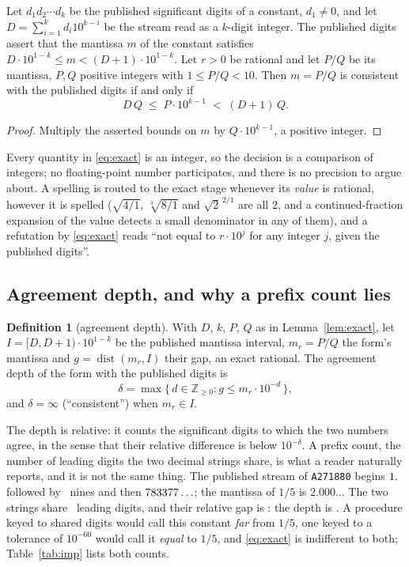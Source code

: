 \documentclass[11pt]{article}
\theoremstyle{definition}
\newtheorem{definition}{Definition}
\theoremstyle{plain}
\begin{document}
\begin{lemma}\label{lem:exact}
Let $d_1d_2\cdots d_k$ be the published significant digits of a constant, $d_1\neq0$, and let $D=\sum_{i=1}^k d_i10^{k-i}$ be the stream read as a $k$-digit integer. The published digits assert that the mantissa $m$ of the constant satisfies $D\cdot10^{1-k}\le m<(D+1)\cdot10^{1-k}$. Let $r>0$ be rational and let $P/Q$ be its mantissa, $P,Q$ positive integers with $1\le P/Q<10$. Then $m=P/Q$ is consistent with the published digits if and only if
\begin{equation}\label{eq:exact}
D\,Q\;\le\;P\cdot10^{k-1}\;<\;(D+1)\,Q .
\end{equation}
\end{lemma}
\begin{proof}
Multiply the asserted bounds on $m$ by $Q\cdot10^{k-1}$, a positive integer.
\end{proof}

Every quantity in \eqref{eq:exact} is an integer, so the decision is a comparison of integers; no floating-point number participates, and there is no precision to argue about. A spelling is routed to the exact stage whenever its \emph{value} is rational, however it is spelled ($\sqrt{4/1}$, $\sqrt[3]{8/1}$ and $\sqrt2^{\,2/1}$ are all $2$, and a continued-fraction expansion of the value detects a small denominator in any of them), and a refutation by \eqref{eq:exact} reads ``not equal to $r\cdot10^j$ for any integer $j$, given the published digits''.

\subsection{Agreement depth, and why a prefix count lies}\label{sec:depth}

\begin{definition}[agreement depth]\label{def:depth}
With $D$, $k$, $P$, $Q$ as in Lemma~\ref{lem:exact}, let $I=[D,D+1)\cdot10^{1-k}$ be the published mantissa interval, $m_r=P/Q$ the form's mantissa and $g=\operatorname{dist}(m_r,I)$ their gap, an exact rational. The agreement depth of the form with the published digits is
\[
\delta=\max\{\,d\in\mathbb Z_{\ge0}: g\le m_r\cdot10^{-d}\,\},
\]
and $\delta=\infty$ (``consistent'') when $m_r\in I$.
\end{definition}

The depth is relative: it counts the significant digits to which the two numbers agree, in the sense that their relative difference is below $10^{-\delta}$. A prefix count, the number of leading digits the two decimal strings share, is what a reader naturally reports, and it is not the same thing. The published stream of \texttt{A271880} begins $1.$ followed by \EvilNines\ nines and then $783377\ldots$; the mantissa of $1/5$ is $2.000\ldots$ The two strings share \EvilPrefix\ leading digits, and their relative gap is \EvilGapRel: the depth is \EvilDepth. A procedure keyed to shared digits would call this constant \emph{far} from $1/5$, one keyed to a tolerance of $10^{-60}$ would call it \emph{equal} to $1/5$, and \eqref{eq:exact} is indifferent to both; Table~\ref{tab:imp} lists both counts.
\end{document}
